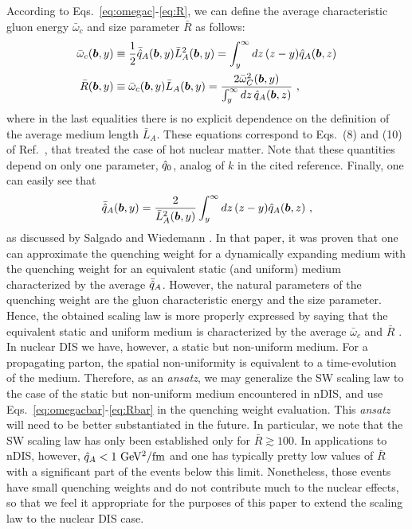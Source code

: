 According to Eqs.~\eqref{eq:omegac}-\eqref{eq:R}, we can define the average 
characteristic gluon energy $\bar\omega_c$ and size parameter $\bar R$ as 
follows:
\begin{align}
  \bar\omega_c(\vec b,y)& \equiv \frac{1}{2} \bar\qhat_A(\vec b,y) 
    \bar L_A^2(\vec b,y) 
    = \int_y^\infty dz\, (z-y)\qhat_A(\vec b,z) 
  \label{eq:omegacbar} \\
  \bar R(\vec b,y) & \equiv \bar\omega_c(\vec b,y) \bar L_A(\vec b,y) 
    = \frac{2 \bar\omega_C^2(\vec b,y)}{\int_y^\infty dz\,
    \qhat_A(\vec b,z)} \ , 
  \label{eq:Rbar}
\end{align}
where in the last equalities there is no explicit dependence on the definition 
of the average medium length $\bar L_A$. These equations correspond to Eqs.~(8) 
and (10) of Ref.~\cite{Dainese:2004te}, that treated the case of hot nuclear matter. Note that these quantities depend on only one parameter, ${\hat q}_0$, analog of $k$ in the cited reference. Finally, one can easily see that
\begin{align}
  \bar\qhat_A(\vec b,y) = \frac{2}{\bar L_A^2(\vec b,y)} \int_y^\infty dz\,
    (z-y)\qhat_A(\vec b,z) \ ,
\end{align}
as discussed by Salgado and Wiedemann \cite{Salgado:2003gb}. In that paper, it was proven that one can approximate the quenching weight for a dynamically expanding medium with the quenching weight for an equivalent static (and uniform) medium characterized by the average $\bar{{\hat q}}_A$. However, the natural parameters of the quenching weight are the gluon characteristic energy and the size parameter. Hence, the obtained scaling law is more properly expressed by saying that the equivalent static and uniform medium is characterized by the average $\bar \omega_c$ and $\bar R$ \cite{Dainese:2004te}. In nuclear DIS we have, however, a static but non-uniform medium. For a propagating parton, the spatial non-uniformity is equivalent to a time-evolution of the medium. Therefore, as an {\it ansatz}, we may generalize the SW scaling law to the case of the static but non-uniform medium encountered in nDIS, and use Eqs.~\eqref{eq:omegacbar}-\eqref{eq:Rbar} in the quenching weight evaluation. This {\it ansatz} will need to be better substantiated in the future. In particular, we note that the SW scaling law has only been established only for $\bar R \gtrsim 100$. In applications to nDIS, however, ${\hat q}_A < 1\ \text{GeV$^2$/fm}$ and one 
has typically pretty low values of $\bar R$ with a significant part of the 
events below this limit. Nonetheless, those events have small quenching weights and do not contribute much to the nuclear effects, so that we feel it appropriate for the purposes of this paper to extend the scaling law to the nuclear DIS case.



